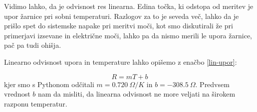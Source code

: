 \documentclass[10pt]{article}
\begin{document}
\noindent Vidimo lahko, da je odvisnost res linearna. Edina točka, ki odstopa od meritev je upor žarnice pri sobni temperaturi. Razlogov za to je seveda več, lahko da je prišlo spet do sistemske napake pri meritvi moči, kot smo diskutirali že pri primerjavi izsevane in električne moči, lahko pa da nismo merili le upora žarnice, pač pa tudi ohišja.

Linearno odvisnost upora in temperature lahko opišemo z enačbo \ref{lin-upor}:

\begin{equation}
    R = m T + b
    \label{lin-upor}
\end{equation}
kjer smo s Pythonom odčitali $m = 0.720\ \Omega /K$ in $b = -308.5\ \Omega$. Predvsem vrednost $b$ nam da misliti, da linearna odvisnost ne more veljati na širokem razponu temperatur.
\end{document}
